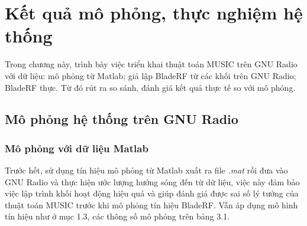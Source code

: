 \clearpage
{}

\setcounter{chapter}{2}
\chapter[{KẾT QUẢ MÔ PHỎNG, THỰC NGHIỆM HỆ THỐNG}]{Kết quả mô phỏng, thực nghiệm hệ thống}

Trong chương này, trình bày việc triển khai thuật toán MUSIC trên GNU Radio với dữ liệu: mô phỏng từ Matlab; giả lập BladeRF từ các khối trên GNU Radio; BladeRF thực. Từ đó rút ra so sánh, đánh giá kết quả thực tế so với mô phỏng.

\section{Mô phỏng hệ thống trên GNU Radio}

\subsection{Mô phỏng với dữ liệu Matlab}

Trước hết, sử dụng tín hiệu mô phỏng từ Matlab xuất ra file \textit{.mat} rồi đưa vào GNU Radio và thực hiện ước lượng hướng sóng đến từ dữ liệu, việc này đảm bảo việc lập trình khối hoạt động hiệu quả và giúp đánh giá được sai số lý tưởng của thuật toán MUSIC trước khi mô phỏng tín hiệu BladeRF. Vẫn áp dụng mô hình tín hiệu như ở mục 1.3, các thông số mô phỏng trên bảng 3.1.

